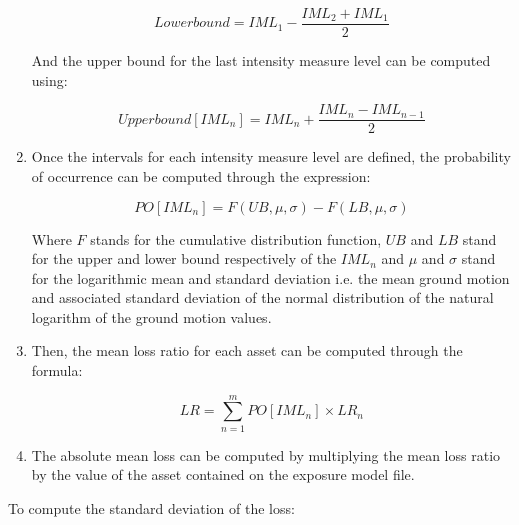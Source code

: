 \begin{enumerate}
\begin{equation}
Lower bound= IML_1-\frac{IML_2+IML_{1}}{2}
\end{equation}

And the upper bound for the last intensity measure level can be computed using:

\begin{equation}
Upper bound[IML_{n}]  = IML_{n}+\frac{IML_{n}-IML_{n-1}}{2}
\end{equation}

\item Once the intervals for each intensity measure level are defined, the probability of occurrence can be computed through the expression:

\begin{equation}
PO[IML_{n}]  = F(UB,\mu,\sigma)-F(LB,\mu,\sigma)
\end{equation}

Where $F$ stands for the cumulative distribution function, $UB$ and $LB$ stand for the upper and lower bound respectively of the $IML_n$ and $\mu$ and $\sigma$ stand for the logarithmic mean and standard deviation i.e. the mean ground motion and associated standard deviation of the normal distribution of the natural logarithm of the ground motion values.

\item Then, the mean loss ratio for each asset can be computed through the formula:

\begin{equation}
LR  = \sum_{n=1}^mPO[IML_n] \times LR_n
\end{equation}

\item The absolute mean loss can be computed by multiplying the mean loss ratio by the value of the asset contained on the exposure model file.

\end{enumerate}

To compute the standard deviation of the loss:

